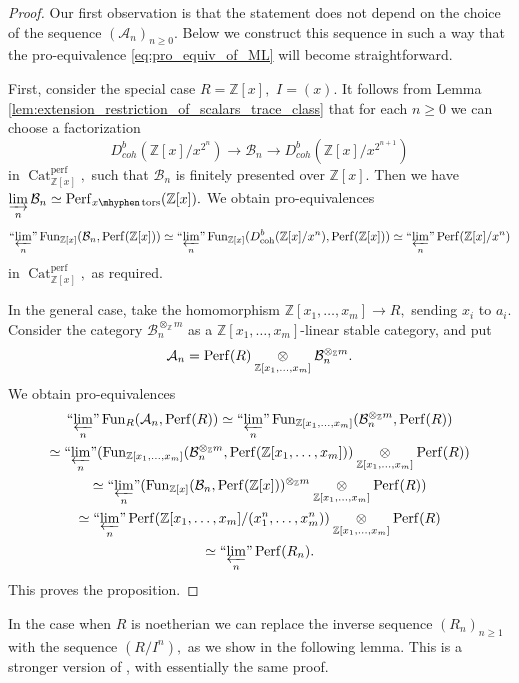\documentclass[11pt,leqno]{amsart}
\numberwithin{equation}{section}
\def\Z{\mathbb{Z}}
\def\coh{\operatorname{coh}}
\newcommand{\tens}[1]{%
  \mathbin{\mathop{\otimes}\displaylimits_{#1}}%
}
\newcommand{\hy}{\mhyphen}
\newcommand{\indlim}[1][]{\mathop{\varinjlim}\limits_{#1}}
\newcommand{\prolim}[1][]{\mathop{\varprojlim}\limits_{#1}}
\newcommand{\proolim}[1][]{{``{\prolim[#1]}"}}
\newcommand{\Cat}{\operatorname{Cat}}
\newcommand{\cA}{{\mathcal A}}
\newcommand{\cB}{{\mathcal B}}
\newcommand{\Fun}{\operatorname{Fun}}
\newcommand{\Perf}{\operatorname{Perf}}
\newcommand{\perf}{\operatorname{perf}}
\newcommand{\tors}{\operatorname{tors}}
\begin{document}
\begin{proof}Our first observation is that the statement does not depend on the choice of the sequence $(\cA_n)_{n\geq 0}.$ Below we construct this sequence in such a way that the pro-equivalence \eqref{eq:pro_equiv_of_ML} will become straightforward.
	
First, consider the special case $R=\Z[x],$ $I=(x).$ It follows from Lemma \ref{lem:extension_restriction_of_scalars_trace_class} that for each $n\geq 0$ we can choose a factorization
\begin{equation*}
D^b_{coh}(\Z[x]/x^{2^n})\to \cB_n\to D^b_{coh}(\Z[x]/x^{2^{n+1}})
\end{equation*}
in $\Cat_{\Z[x]}^{\perf},$ such that $\cB_n$ is finitely presented over $\Z[x].$ Then we have $\indlim[n]\cB_n\simeq\Perf_{x\hy\tors}(\Z[x]).$ We obtain pro-equivalences
\begin{equation*}
\proolim[n]\Fun_{\Z[x]}(\cB_n,\Perf(\Z[x]))\simeq \proolim[n]\Fun_{\Z[x]}(D^b_{\coh}(\Z[x]/x^n),\Perf(\Z[x]))\simeq\proolim[n]\Perf(\Z[x]/x^n)
\end{equation*}
in $\Cat_{\Z[x]}^{\perf},$ as required.

In the general case, take the homomorphism $\Z[x_1,\dots,x_m]\to R,$ sending $x_i$ to $a_i.$ Consider the category $\cB_n^{\otimes_{\Z}m}$ as a $\Z[x_1,\dots,x_m]$-linear stable category, and put
\begin{equation*}
\cA_n = \Perf(R)\tens{\Z[x_1,\dots,x_m]}\cB_n^{\otimes_{\Z}m}.
\end{equation*}   
We obtain pro-equivalences
\begin{multline*}
\proolim[n]\Fun_R(\cA_n,\Perf(R))\simeq\proolim[n]\Fun_{\Z[x_1,\dots,x_m]}(\cB_n^{\otimes_{\Z}m},\Perf(R))\\
\simeq \proolim[n](\Fun_{\Z[x_1,\dots,x_m]}(\cB_n^{\otimes_{\Z}m},\Perf(\Z[x_1,\dots,x_m]))\tens{\Z[x_1,\dots,x_m]}\Perf(R))\\
\simeq\proolim[n](\Fun_{\Z[x]}(\cB_n,\Perf(\Z[x]))^{\otimes_{\Z}m}\tens{\Z[x_1,\dots,x_m]}\Perf(R))\\
\simeq\proolim[n]\Perf(\Z[x_1,\dots,x_m]/(x_1^n,\dots,x_m^n))\tens{\Z[x_1,\dots,x_m]}\Perf(R)\\
\simeq\proolim[n]\Perf(R_n).
\end{multline*}
This proves the proposition.
\end{proof}

In the case when $R$ is noetherian we can replace the inverse sequence $(R_n)_{n\geq 1}$ with the sequence $(R/I^n),$ as we show in the following lemma. This is a stronger version of \cite[Lemma 2.5]{Har}, with essentially the same proof.
\end{document}
